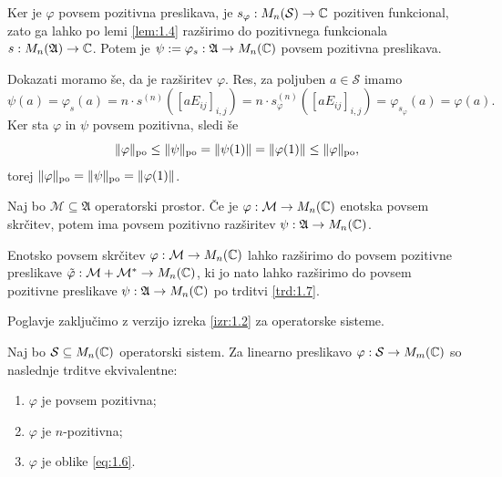 \begin{dokaz}
    Ker je $\varphi$ povsem pozitivna preslikava, je $s_{\varphi}: M_n(\mathcal{S}) \to \mathbb C$
    pozitiven funkcional, zato ga lahko po lemi \ref{lem:1.4} razširimo do pozitivnega funkcionala $s: M_n(\mathfrak{A}) \to \mathbb C$.
    Potem je $\psi := \varphi_s : \mathfrak{A} \to M_n (\mathbb C)$ povsem pozitivna preslikava.

    Dokazati moramo še, da je razširitev $\varphi$. Res, za poljuben $a \in \mathcal{S}$ imamo 
    $$\psi (a) = \varphi_s (a) = n \cdot s^{(n)} ([a E_{ij}]_{i, j}) = n \cdot s_{\varphi}^{(n)} ([a E_{ij}]_{i, j}) = \varphi_{s_{\varphi}} (a) = \varphi(a).$$
    Ker sta $\varphi$ in $\psi$ povsem pozitivna, sledi še 
    \begin{equation*}
        \| \varphi \|_{\operatorname{po}} \leq \| \psi \|_{\operatorname{po}} = \| \psi (1)\| = \|\varphi(1)\| \leq \| \varphi\|_{\operatorname{po}},
    \end{equation*}
    torej $\| \varphi\|_{\operatorname{po}} = \| \psi \|_{\operatorname{po}} = \| \varphi (1)\|$.
\end{dokaz}

\begin{posledica}
    Naj bo $\mathcal{M} \subseteq \mathfrak{A}$ operatorski prostor.
    Če je $\varphi: \mathcal{M} \to M_n (\mathbb C)$ enotska povsem skrčitev,
    potem ima povsem pozitivno razširitev $\psi: \mathfrak{A} \to M_n (\mathbb C)$.
\end{posledica}

\begin{dokaz}
    Enotsko povsem skrčitev $\varphi: \mathcal{M} \to M_n (\mathbb C)$ lahko razširimo do 
    povsem pozitivne preslikave $\tilde{\varphi}: \mathcal{M} + \mathcal{M}^* \to M_n (\mathbb C)$,
    ki jo nato lahko razširimo do povsem pozitivne preslikave $\psi: \mathfrak{A} \to M_n (\mathbb C)$ po trditvi \ref{trd:1.7}.
\end{dokaz}

Poglavje zaključimo z verzijo izreka \ref{izr:1.2} za operatorske sisteme.

\begin{trditev}
    Naj bo $\mathcal{S} \subseteq M_n (\mathbb C)$ operatorski sistem.
    Za linearno preslikavo $\varphi: \mathcal{S} \to M_m (\mathbb C)$ so naslednje trditve ekvivalentne:
    \begin{enumerate}
        \item $\varphi$ je povsem pozitivna;
        \item $\varphi$ je $n$-pozitivna;
        \item $\varphi$ je oblike \eqref{eq:1.6}.
    \end{enumerate}
\end{trditev}

